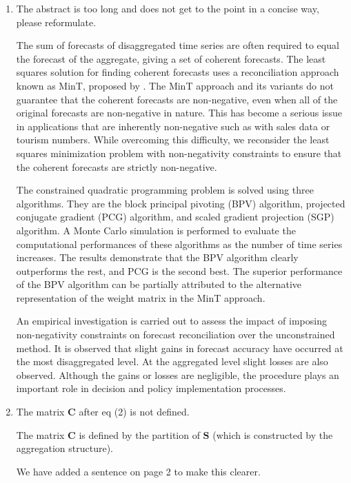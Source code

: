 \documentclass[10pt,a4paper]{article}
\begin{document}
\begin{enumerate}
\item
  The abstract is too long and does not get to the point in a concise way, please reformulate.

  {\color{blue}
  The sum of forecasts of disaggregated time series are often required to equal the forecast of the aggregate, giving a set of coherent forecasts. The least squares solution for finding coherent forecasts uses a reconciliation approach known as MinT, proposed by \citet{Wick2018}. The MinT approach and its variants do not guarantee that the coherent forecasts are non-negative, even when all of the original forecasts are non-negative in nature. This has become a serious issue in applications that are inherently non-negative such as with sales data or tourism numbers. While overcoming this difficulty, we reconsider the least squares minimization problem with non-negativity constraints to ensure that the coherent forecasts are strictly non-negative.

  The constrained quadratic programming problem is solved using three algorithms. They are the block principal pivoting (BPV) algorithm, projected conjugate gradient (PCG) algorithm, and scaled gradient projection (SGP) algorithm. A Monte Carlo simulation is performed to evaluate the computational performances of these algorithms as the number of time series increases. The results demonstrate that the BPV algorithm clearly outperforms the rest, and PCG is the second best. The superior performance of the BPV algorithm can be partially attributed to the alternative representation of the weight matrix in the MinT approach.

  An empirical investigation is carried out to assess the impact of imposing non-negativity constraints on forecast reconciliation over the unconstrained method. It is observed that slight gains in forecast accuracy have occurred at the most disaggregated level. At the aggregated level slight losses are also observed. Although the gains or losses are negligible, the procedure plays an important role in decision and policy implementation processes.}

\item
  The matrix $\bm{C}$ after eq (2) is not defined.

  {\color{blue}The matrix $\bm{C}$ is defined by the partition of $\bm{S}$ (which is constructed by the aggregation structure).
  
	We have added a sentence on page 2 to make this clearer.}


\end{enumerate}
\end{document}
